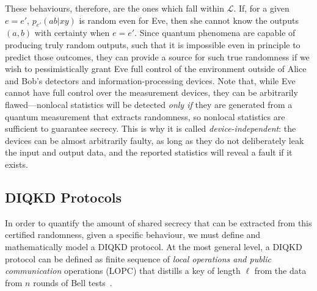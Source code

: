 \documentclass[10pt, a4paper]{article}
\numberwithin{equation}{section} %
\theoremstyle{definition}
\theoremstyle{plain}
\newcommand{\?}{\mathrel{?}} %
\newcommand{\Ls}{\mathcal{L}}
\begin{document}
    These behaviours, therefore, are the ones which fall within \(\Ls\). If, for a given \(e = e'\), \(p_{e'}(ab|xy)\) is random even for Eve, then she cannot know the outputs \((a,b)\) with certainty when \(e=e'\). Since quantum phenomena are capable of producing truly random outputs, such that it is impossible even in principle to predict those outcomes, they can provide a source for such true randomness if we wish to pessimistically grant Eve full control of the environment outside of Alice and Bob's detectors and information-processing devices. Note that, while Eve cannot have full control over the measurement devices, they can be arbitrarily flawed---nonlocal statistics will be detected \emph{only if} they are generated from a quantum measurement that extracts randomness, so nonlocal statistics are sufficient to guarantee secrecy. This is why it is called \emph{device-independent}: the devices can be almost arbitrarily faulty, as long as they do not deliberately leak the input and output data, and the reported statistics will reveal a fault if it exists.

    \subsection{DIQKD Protocols}\label{sec:diqkd_proto}

    In order to quantify the amount of shared secrecy that can be extracted from this certified randomness, given a specific behaviour, we must define and mathematically model a DIQKD protocol. At the most general level, a DIQKD protocol can be defined as finite sequence of \emph{local operations and public communication} operations (LOPC) that distills a key of length \(\ell\) from the data from \(n\) rounds of Bell tests~\cite{DIQKD_Limits}.
\end{document}

